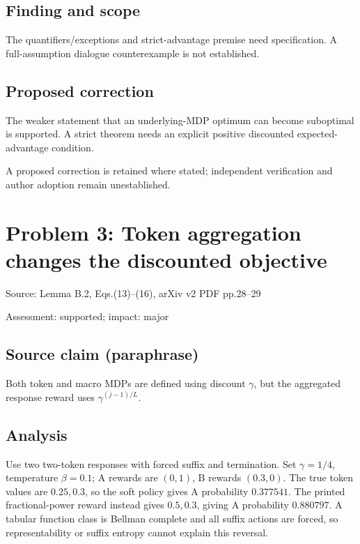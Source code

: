 \documentclass[11pt]{article}
\begin{document}
\subsection*{Finding and scope}

The quantifiers/exceptions and strict-advantage premise need specification. A full-assumption dialogue counterexample is not established.

\subsection*{Proposed correction}

The weaker statement that an underlying-MDP optimum can become suboptimal is supported. A strict theorem needs an explicit positive discounted expected-advantage condition.

A proposed correction is retained where stated; independent verification and author adoption remain unestablished.

\section*{Problem 3: Token aggregation changes the discounted objective}

Source: Lemma B.2, Eqs.(13)–(16), arXiv v2 PDF pp.28–29

Assessment: supported; impact: major

\subsection*{Source claim (paraphrase)}

Both token and macro MDPs are defined using discount \(\gamma\), but the aggregated response reward uses \(\gamma^{(j-1)/L}\).

\subsection*{Analysis}

Use two two-token responses with forced suffix and termination. Set \(\gamma=1/4\), temperature \(\beta=0.1\); A rewards are \((0,1)\), B rewards \((0.3,0)\). The true token values are \(0.25,0.3\), so the soft policy gives A probability \(0.377541\). The printed fractional-power reward instead gives \(0.5,0.3\), giving A probability \(0.880797\). A tabular function class is Bellman complete and all suffix actions are forced, so representability or suffix entropy cannot explain this reversal.
\end{document}
